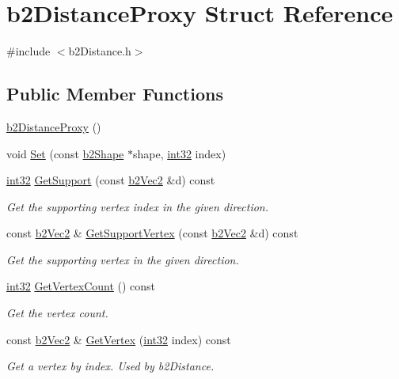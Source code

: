 \hypertarget{structb2_distance_proxy}{}\section{b2\+Distance\+Proxy Struct Reference}
\label{structb2_distance_proxy}


{\ttfamily \#include $<$b2\+Distance.\+h$>$}

\subsection*{Public Member Functions}
\begin{DoxyCompactItemize}
\item 
\mbox{\hyperlink{structb2_distance_proxy_ae3b74189ecd4d85b078a9386274dd9b6}{b2\+Distance\+Proxy}} ()
\item 
void \mbox{\hyperlink{structb2_distance_proxy_a80a59a9c9e952482a8fc6db4b883365d}{Set}} (const \mbox{\hyperlink{classb2_shape}{b2\+Shape}} $\ast$shape, \mbox{\hyperlink{b2_settings_8h_a43d43196463bde49cb067f5c20ab8481}{int32}} index)
\item 
\mbox{\hyperlink{b2_settings_8h_a43d43196463bde49cb067f5c20ab8481}{int32}} \mbox{\hyperlink{structb2_distance_proxy_a39de286cc0c1e829adfacfa0061b04f2}{Get\+Support}} (const \mbox{\hyperlink{structb2_vec2}{b2\+Vec2}} \&d) const
\begin{DoxyCompactList}\small\item\em Get the supporting vertex index in the given direction. \end{DoxyCompactList}\item 
const \mbox{\hyperlink{structb2_vec2}{b2\+Vec2}} \& \mbox{\hyperlink{structb2_distance_proxy_a245993f09e9f3d3f374bb95041acf822}{Get\+Support\+Vertex}} (const \mbox{\hyperlink{structb2_vec2}{b2\+Vec2}} \&d) const
\begin{DoxyCompactList}\small\item\em Get the supporting vertex in the given direction. \end{DoxyCompactList}\item 
\mbox{\hyperlink{b2_settings_8h_a43d43196463bde49cb067f5c20ab8481}{int32}} \mbox{\hyperlink{structb2_distance_proxy_a99c461f28d484429dac8f14b58f63d89}{Get\+Vertex\+Count}} () const
\begin{DoxyCompactList}\small\item\em Get the vertex count. \end{DoxyCompactList}\item 
const \mbox{\hyperlink{structb2_vec2}{b2\+Vec2}} \& \mbox{\hyperlink{structb2_distance_proxy_a9073b2c680d3fee6399f15be79ad144a}{Get\+Vertex}} (\mbox{\hyperlink{b2_settings_8h_a43d43196463bde49cb067f5c20ab8481}{int32}} index) const
\begin{DoxyCompactList}\small\item\em Get a vertex by index. Used by b2\+Distance. \end{DoxyCompactList}\end{DoxyCompactItemize}
